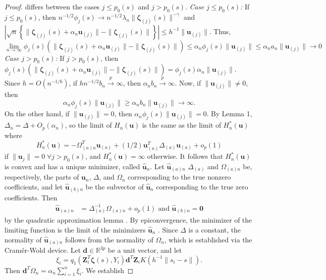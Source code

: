 \documentclass[authoryear,review, 12pt]{elsarticle}
\begin{document}
\begin{proof}
differs between the cases $j\le p_{0}(s)$ and $j>p_{0}(s)$.
\emph{Case $j\le p_{0}(s)$:} If $j\le p_{0}(s)$, then $n^{-1/2}\phi_{j}(s)\to n^{-1/2}\lambda_{n}\|\bm{\zeta}_{(j)}(s)\|^{-\gamma}$
and $|\sqrt{n}\left\{ \|\bm{\zeta}_{(j)}(s)+\alpha_{n}\bm{u}_{(j)}\|-\|\bm{\zeta}_{(j)}(s)\|\right\} |\le h^{-1}\|\bm{u}_{(j)}\|$. Thus, 
\[
\lim\limits _{n\to\infty}\phi_{j}(s)\left(\|\bm{\zeta}_{(j)}(s)+\alpha_{n}\bm{u}_{(j)}\|-\|\bm{\zeta}_{(j)}(s)\|\right)\le\alpha_{n}\phi_{j}(s)\|\bm{u}_{(j)}\|\le\alpha_{n}a_{n}\|\bm{u}_{(j)}\|\to0
\]
\emph{Case $j>p_{0}(s)$:} If $j>p_{0}(s)$, then $\phi_{j}(s)\left(\|\bm{\zeta}_{(j)}(s)+\alpha_{n}\bm{u}_{(j)}\|-\|\bm{\zeta}_{(j)}(s)\|\right)=\phi_{j}(s)\alpha_{n}\|\bm{u}_{(j)}\|$.
Since $h=O(n^{-1/6})$, if $hn^{-1/2}b_{n}\xrightarrow{p}\infty$,
then $\alpha_{n}b_{n}\xrightarrow{p}\infty$. Now, if $\|\bm{u}_{(j)}\|\ne0$,
then 
\[
\alpha_{n}\phi_{j}(s)\|\bm{u}_{(j)}\|\ge\alpha_{n}b_{n}\|\bm{u}_{(j)}\|\to\infty.
\]
On the other hand, if $\|\bm{u}_{(j)}\|=0$, then $\alpha_{n}\phi_{j}(s)\|\bm{u}_{(j)}\|=0$.
By Lemma 1, $\Delta_{n}=\Delta+O_{p}\left(\alpha_{n}\right)$,
so the limit of $H_{n}(\bm{u})$ is the same as the limit of $H_{n}^{*}(\bm{u})$
where
\[
H_{n}^{*}(\bm{u})= -\Omega_{(a)n}^{T}\bm{u}_{(a)}+(1/2)\bm{u}_{(a)}^{T}\Delta_{(a)}\bm{u}_{(a)}+o_{p}\left(1\right)
\]
if $\|\bm{u}_{j}\|=0\;\forall j>p_{0}(s)$, and $H_{n}^{*}(\bm{u})=\infty$
otherwise. It follows that $H_{n}^{*}(\bm{u})$ is convex and has
a unique minimizer, called $\hat{\bm{u}}_{n}$. Let $\hat{\bm{u}}_{(a)n}$
$\Delta_{(a)}$ and $\Omega_{(a)n}$ be, respectively, the parts of
$\bm{u}_{n}$, $\Delta$, and $\Omega_{n}$ corresponding to the true
nonzero coefficients, and let $\hat{\bm{u}}_{(b)n}$ be the subvector
of $\hat{\bm{u}}_{n}$ corresponding to the true zero coefficients.
Then
\begin{align*}
\hat{\bm{u}}_{(a)n} &= \Delta_{(a)}^{-1}\Omega_{(a)n}+o_{p}\left(1\right)\text{ and }\hat{\bm{u}}_{(b)n}=\bm{0}
\end{align*}
by the quadratic approximation lemma \citep{Fan-Gijbels-1996}. By epiconvergence, the minimizer of the limiting function is the limit
of the minimizers $\hat{\bm{u}}_{n}$ \citep{Geyer-1994}.
Since $\Delta$ is a constant, the normality of $\hat{\bm{u}}_{(a)n}$
follows from the normality of $\Omega_{n}$, which is established
via the Cram\'{e}r-Wold device. Let $\bm{d}\in\mathbb{R}^{3p}$ be
a unit vector, and let
\[
\xi_{i}=q_{1}\left(\bm{Z}_{i}^{T}\bm{\zeta}(s),Y_{i}\right)\bm{d}^{T}\bm{Z}_{i}K\left(h^{-1}\|s_{i}-s\|\right).
\]
Then $\bm{d}^{T}\Omega_{n}=\alpha_{n}\sum_{i=1}^{n}\xi_{i}$. We establish

\end{proof}
\end{document}

